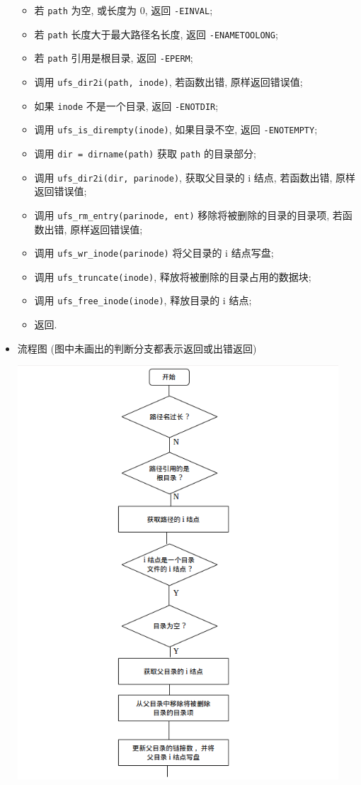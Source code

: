 \documentclass[nofonts]{ctexart}
\begin{document}
\begin{itemize}
  \begin{itemize}
  \item
    若 \texttt{path} 为空, 或长度为 0, 返回 \texttt{-EINVAL};
  \item
    若 \texttt{path} 长度大于最大路径名长度, 返回
    \texttt{-ENAMETOOLONG};
  \item
    若 \texttt{path} 引用是根目录, 返回 \texttt{-EPERM};
  \item
    调用 \texttt{ufs\_dir2i(path, inode)}, 若函数出错, 原样返回错误值;
  \item
    如果 \texttt{inode} 不是一个目录, 返回 \texttt{-ENOTDIR};
  \item
    调用 \texttt{ufs\_is\_dirempty(inode)}, 如果目录不空, 返回
    \texttt{-ENOTEMPTY};
  \item
    调用 \texttt{dir = dirname(path)} 获取 \texttt{path} 的目录部分;
  \item
    调用 \texttt{ufs\_dir2i(dir, parinode)}, 获取父目录的 i 结点,
    若函数出错, 原样返回错误值;
  \item
    调用 \texttt{ufs\_rm\_entry(parinode, ent)}
    移除将被删除的目录的目录项, 若函数出错, 原样返回错误值;
  \item
    调用 \texttt{ufs\_wr\_inode(parinode)} 将父目录的 i 结点写盘;
  \item
    调用 \texttt{ufs\_truncate(inode)}, 释放将被删除的目录占用的数据块;
  \item
    调用 \texttt{ufs\_free\_inode(inode)}, 释放目录的 i 结点;
  \item
    返回.
  \end{itemize}
\item
  流程图
  (图中未画出的判断分支都表示返回或出错返回)

  \includegraphics[width=12cm]{./images/./rmdir_1.png}


\end{itemize}
\end{document}
